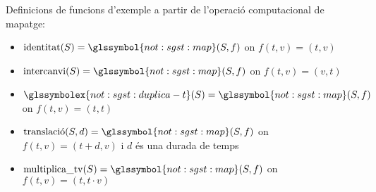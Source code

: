 \begin{example}
  Definicions de funcions d'exemple a partir de l'operació
  computacional de mapatge:

\label{ex:sgst:duplicat}
\begin{itemize}
\item $\operatorname{identitat}(S)= \glssymbol{not:sgst:map}(S,f)$ on
  $f(t,v)=(t,v)$
\item $\operatorname{intercanvi}(S)=
  \glssymbol{not:sgst:map}(S,f)$ on $f(t,v)=(v,t)$
\item $\glssymbolex{not:sgst:duplica-t}(S)=
  \glssymbol{not:sgst:map}(S,f)$ on $f(t,v)=(t,t)$
\item $\operatorname{translaci\acute{o}}(S,d)=
  \glssymbol{not:sgst:map}(S,f)$ on $f(t,v)=(t+d,v)$ i $d$ és una
  durada de temps
\item $\operatorname{multiplica\_tv}(S)=
  \glssymbol{not:sgst:map}(S,f)$ on $f(t,v)=(t,t\cdot v)$


\end{itemize}
\end{example}

